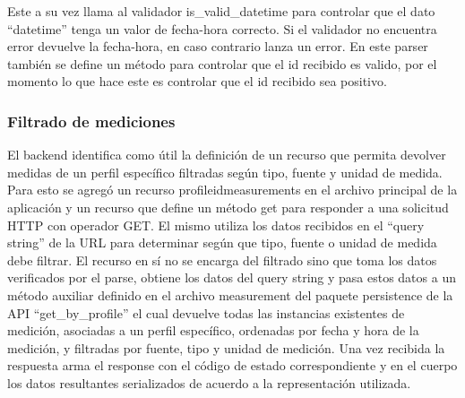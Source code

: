 Este a su vez llama al validador is\_valid\_datetime para controlar que el dato ``datetime'' tenga un valor de fecha-hora correcto. Si el validador no encuentra error devuelve la fecha-hora, en caso contrario lanza un error.
En este parser también se define un método para controlar que el id recibido es valido, por el momento lo que hace este es controlar que el id recibido sea positivo.

\subsubsection{Filtrado de mediciones}
El backend identifica como útil la definición de un recurso que permita devolver medidas de un perfil específico filtradas según tipo, fuente y unidad de medida. Para esto se agregó un recurso \/profile\/id\/measurements en el archivo principal de la aplicación y un recurso que define un método get para responder a una solicitud HTTP con operador GET. El mismo utiliza los datos recibidos en el ``query string'' de la URL para determinar según que tipo, fuente o unidad de medida debe filtrar. El recurso en sí no se encarga del filtrado sino que toma los datos verificados por el parse, obtiene los datos del query string y pasa estos datos a un método auxiliar definido en el archivo measurement del paquete persistence de la API ``get\_by\_profile'' el cual devuelve todas las instancias existentes de medición, asociadas a un perfil específico, ordenadas por fecha y hora de la medición, y filtradas por fuente, tipo y unidad de medición. Una vez recibida la respuesta arma el response con el código de estado correspondiente y en el cuerpo los datos resultantes serializados de acuerdo a la representación utilizada.


